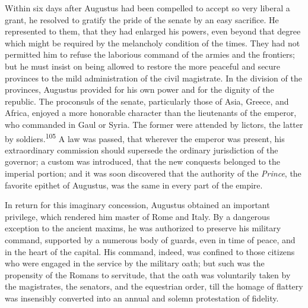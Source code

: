 Within six days after Augustus had been compelled to accept so
very liberal a grant, he resolved to gratify the pride of the
senate by an easy sacrifice. He represented to them, that they
had enlarged his powers, even beyond that degree which might be
required by the melancholy condition of the times. They had not
permitted him to refuse the laborious command of the armies and
the frontiers; but he must insist on being allowed to restore the
more peaceful and secure provinces to the mild administration of
the civil magistrate. In the division of the provinces, Augustus
provided for his own power and for the dignity of the republic.
The proconsuls of the senate, particularly those of Asia, Greece,
and Africa, enjoyed a more honorable character than the
lieutenants of the emperor, who commanded in Gaul or Syria. The
former were attended by lictors, the latter by soldiers.\textsuperscript{105} A
law was passed, that wherever the emperor was present, his
extraordinary commission should supersede the ordinary
jurisdiction of the governor; a custom was introduced, that the
new conquests belonged to the imperial portion; and it was soon
discovered that the authority of the \textit{Prince}, the favorite
epithet of Augustus, was the same in every part of the empire.


In return for this imaginary concession, Augustus obtained an
important privilege, which rendered him master of Rome and Italy.
By a dangerous exception to the ancient maxims, he was authorized
to preserve his military command, supported by a numerous body of
guards, even in time of peace, and in the heart of the capital.
His command, indeed, was confined to those citizens who were
engaged in the service by the military oath; but such was the
propensity of the Romans to servitude, that the oath was
voluntarily taken by the magistrates, the senators, and the
equestrian order, till the homage of flattery was insensibly
converted into an annual and solemn protestation of fidelity.

